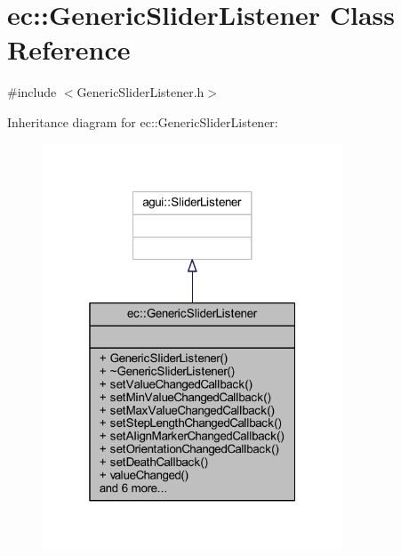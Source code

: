 \hypertarget{classec_1_1_generic_slider_listener}{}\section{ec\+:\+:Generic\+Slider\+Listener Class Reference}
\label{classec_1_1_generic_slider_listener}


{\ttfamily \#include $<$Generic\+Slider\+Listener.\+h$>$}



Inheritance diagram for ec\+:\+:Generic\+Slider\+Listener\+:\nopagebreak
\begin{figure}[H]
\begin{center}
\leavevmode
\includegraphics[width=253pt]{classec_1_1_generic_slider_listener__inherit__graph}
\end{center}
\end{figure}


